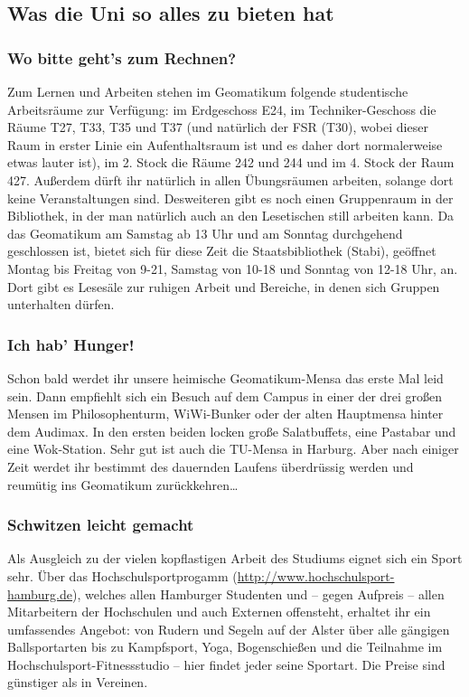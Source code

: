 \subsection{Was die Uni so alles zu bieten hat}

\subsubsection{Wo bitte geht's zum Rechnen?}


Zum Lernen und Arbeiten stehen im Geomatikum folgende studentische Arbeitsräume
zur Verfügung: im Erdgeschoss E24, im Techniker-Geschoss die Räume T27, T33,
T35 und T37 (und natürlich der FSR (T30), wobei dieser Raum in erster Linie ein
Aufenthaltsraum ist und es daher dort normalerweise etwas lauter ist), im 2.
Stock die Räume 242 und 244 und im 4. Stock der Raum 427. Außerdem dürft ihr
natürlich in allen Übungsräumen arbeiten, solange dort keine Veranstaltungen
sind. Desweiteren gibt es noch einen Gruppenraum in der Bibliothek, in der man
natürlich auch an den Lesetischen still arbeiten kann. Da das Geomatikum am
Samstag ab 13 Uhr und am Sonntag durchgehend geschlossen ist, bietet sich für
diese Zeit die Staatsbibliothek (Stabi), geöffnet Montag bis Freitag von 9-21,
Samstag von 10-18 und Sonntag von 12-18 Uhr, an. Dort gibt es Lesesäle zur
ruhigen Arbeit und Bereiche, in denen sich Gruppen unterhalten dürfen.

\subsubsection{Ich hab' Hunger!}

Schon bald werdet ihr unsere heimische Geomatikum-Mensa das erste Mal leid
sein. Dann empfiehlt sich ein Besuch auf dem Campus in einer der drei großen
Mensen im Philosophenturm, WiWi-Bunker oder der alten Hauptmensa hinter dem
Audimax. In den ersten beiden locken große Salatbuffets, eine Pastabar und eine
Wok-Station. Sehr gut ist auch die TU-Mensa in Harburg. Aber nach einiger Zeit
werdet ihr bestimmt des dauernden Laufens überdrüssig werden und reumütig ins
Geomatikum zurückkehren\ldots

\subsubsection{Schwitzen leicht gemacht}

Als Ausgleich zu der vielen kopflastigen Arbeit des Studiums eignet sich ein
Sport sehr. Über das Hochschulsportprogamm
(\url{http://www.hochschulsport-hamburg.de}), welches allen Hamburger Studenten
und -- gegen Aufpreis -- allen Mitarbeitern der Hochschulen und auch Externen
offensteht, erhaltet ihr ein umfassendes Angebot: von Rudern und Segeln auf der
Alster über alle gängigen Ballsportarten bis zu Kampfsport, Yoga, Bogenschießen
und die Teilnahme im Hochschulsport-Fitnessstudio -- hier findet jeder seine
Sportart.  Die Preise sind günstiger als in Vereinen.


